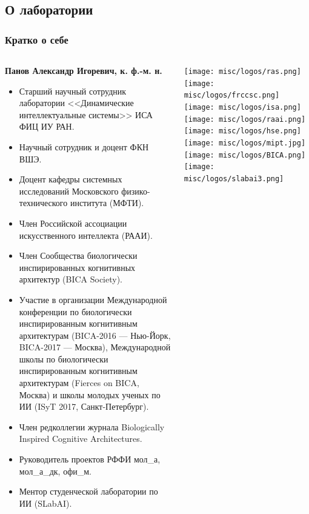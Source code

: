 \documentclass[default]{beamer}
\begin{document}
	\subsection{О лаборатории}
	\begin{frame}
		\frametitle{Кратко о себе}
		\scriptsize
		\begin{columns}
			\begin{column}{0.85\textwidth}
				\textbf{Панов Александр Игоревич, к. ф.-м. н.}
				\begin{itemize}
					\item Старший научный сотрудник лаборатории <<Динамические интеллектуальные системы>> ИСА ФИЦ ИУ РАН.
					\item Научный сотрудник и доцент ФКН ВШЭ.
					\item Доцент кафедры системных исследований Московского физико-технического института (МФТИ).
					\item Член Российской ассоциации искусственного интеллекта (РААИ).
					\item Член Сообщества биологически инспирированных когнитивных архитектур (BICA Society).
					\item Участие в организации Международной конференции по биологически инспирированным когнитивным архитектурам (BICA-2016 --- Нью-Йорк, BICA-2017 --- Москва), Международной школы по биологически инспирированным когнитивным архитектурам (Fierces on BICA, Москва) и школы молодых ученых по ИИ (ISyT 2017, Санкт-Петербург).
					\item Член редколлегии журнала Biologically Inspired Cognitive Architectures.					
					\item Руководитель проектов РФФИ мол\_а, мол\_а\_дк, офи\_м.
					\item Ментор студенческой лаборатории по ИИ (SLabAI).
				\end{itemize}
			\end{column}
			
			\begin{column}{0.15\textwidth}
				\centering
				\texttt{[image: misc/logos/ras.png]}
				\vspace{7pt}
				\texttt{[image: misc/logos/frccsc.png]}
				\vspace{7pt}
				\texttt{[image: misc/logos/isa.png]}
				\vspace{7pt}
				\texttt{[image: misc/logos/raai.png]}
				\vspace{7pt}
				\texttt{[image: misc/logos/hse.png]}
				\vspace{7pt}
				\texttt{[image: misc/logos/mipt.jpg]}
				\vspace{5pt}
				\texttt{[image: misc/logos/BICA.png]}
				\vspace{5pt}
				\texttt{[image: misc/logos/slabai3.png]}
			\end{column}
			
		\end{columns}
	\end{frame}
	
\end{document}
